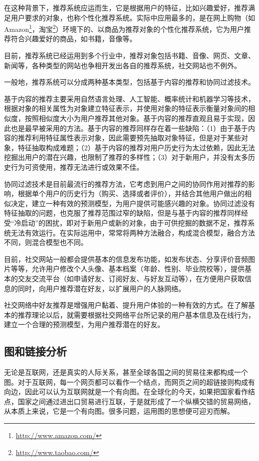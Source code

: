 在这种背景下，推荐系统应运而生，它是根据用户的特征，比如兴趣爱好，推荐满足用户要求的对象，也称个性化推荐系统。实际中应用最多的，是在网上购物（如Amazon\footnote{\url{http://www.amazon.com/}}，淘宝\footnote{\url{http://www.taobao.com/}}）环境下的、以商品为推荐对象的个性化推荐系统，它为用户推荐符合兴趣爱好的商品，如书籍，音像等。

目前，推荐系统已经运用到多个行业中，推荐对象包括书籍、音像、网页、文章、新闻等，各种类型的网站也争相开发出各自的推荐系统，社交网站也不例外。

一般地，推荐系统可以分成两种基本类型\cite{liu2009personalizedrs}，包括基于内容的推荐和协同过滤技术。

基于内容的推荐主要采用自然语言处理、人工智能、概率统计和机器学习等技术，根据对象的相关属性为对象建立特征表示，并使用对象的特征表示衡量对象间的相似度，按照相似度大小为用户推荐其他对象。基于内容的推荐直观且易于实现，因此也是最早被采用的方法。基于内容的推荐同样存在着一些缺陷：（1）由于基于内容的推荐利用特征属性表示对象，因此需要预先抽取对象特征，但是对于某些对象，特征抽取构成难题；（2）基于内容的推荐对用户历史行为太过依赖，因此无法挖掘出用户的潜在兴趣，也限制了推荐的多样性；（3）对于新用户，并没有太多历史行为可资使用，推荐无法进行或效果不佳。

协同过滤技术是目前最流行的推荐方法，它考虑到用户之间的协同作用对推荐的影响，根据单个用户的历史行为（购买、选择或者评价），并结合其他用户做出的相似决定，建立一种有效的预测模型，为用户提供可能感兴趣的对象。协同过滤没有特征抽取的问题，也克服了推荐范围过窄的缺陷，但是与基于内容的推荐同样经受“冷启动”的困扰，即对于新用户或新的对象，由于可供挖掘的数据不足，推荐系统无法有效运行。在实际运用中，常常将两种方法融合，构成混合模型，融合方法不同，则混合模型也不同。

目前，社交网站一般都会提供基本的信息发布功能，如发布状态、分享评价音频图片等等，允许用户修改个人头像、基本档案（年龄、性别、毕业院校等），提供基本的交友交流平台（如申请好友、订阅好友、与好友互动等），在方便用户获取信息的同时，向用户推荐潜在好友，以扩展用户的人脉网络。

社交网络中好友推荐是增强用户黏着、提升用户体验的一种有效的方式。在了解基本的推荐理论以后，就需要根据社交网络平台所记录的用户基本信息及在线行为，建立一个合理的预测模型，为用户推荐潜在的好友。

\subsection{图和链接分析}
无论是互联网，还是真实的人际关系，甚至全球各国之间的贸易往来都构成一个图。对于互联网，每一个网页都可以看作一个结点，而网页之间的超链接则构成有向边，因此可以认为互联网就是一个有向图。在全球化的今天，如果把国家看作结点，国家之间通过进出口贸易进行互联，于是就形成了一个纵横交错的贸易网络，从本质上来说，它是一个有向图。很多问题，运用图的思想便可迎刃而解。

